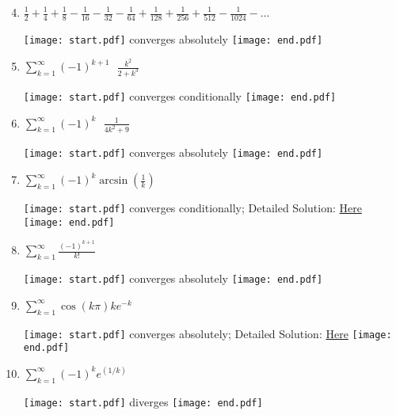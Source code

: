 \documentclass[12pt]{article}
\begin{document}

\medskip

\begin{enumerate}
\setcounter{enumi}{3}

\item $\frac{1}{2}+\frac{1}{4}+\frac{1}{8}-\frac{1}{16}-\frac{1}{32}-\frac{1}{64}+\frac{1}{128}+\frac{1}{256}+\frac{1}{512}-\frac{1}{1024}-\ldots$

\texttt{[image: start.pdf]}
{{converges absolutely}}
\texttt{[image: end.pdf]}


\item $\sum_{k=1}^{\infty}{(-1)^{k+1} \text{ } \frac{k^2}{2+k^3}}$

\texttt{[image: start.pdf]}
{{converges conditionally}}
\texttt{[image: end.pdf]}


\item $\sum_{k=1}^{\infty}{(-1)^{k} \text{ } \frac{1}{4k^2+9}}$

\texttt{[image: start.pdf]}
{{converges absolutely}}
\texttt{[image: end.pdf]}


\item $\sum_{k=1}^{\infty}{(-1)^{k} \arcsin{\left(\frac{1}{k}\right)}}$

\texttt{[image: start.pdf]}
{{converges conditionally; Detailed Solution: \textcolor{blue}{\href{http://www.math.drexel.edu/classes/Calculus/resources/Math123HW/Solutions/123_10_Alternating_Series_7.pdf}{Here}}}}
\texttt{[image: end.pdf]}


\item $\sum_{k=1}^{\infty}{\frac{(-1)^{k+1}}{k!}}$

\texttt{[image: start.pdf]}
{{converges absolutely}}
\texttt{[image: end.pdf]}


\item $\sum_{k=1}^{\infty}{\cos({k\pi})ke^{-k}}$

\texttt{[image: start.pdf]}
{{converges absolutely; Detailed Solution: \textcolor{blue}{\href{http://www.math.drexel.edu/classes/Calculus/resources/Math123HW/Solutions/123_10_Alternating_Series_9.pdf}{Here}}}}
\texttt{[image: end.pdf]}


\item $\sum_{k=1}^{\infty}{(-1)^k e^{(1/k) } }$

\texttt{[image: start.pdf]}
{{diverges}}
\texttt{[image: end.pdf]}



\end{enumerate}
\end{document}

